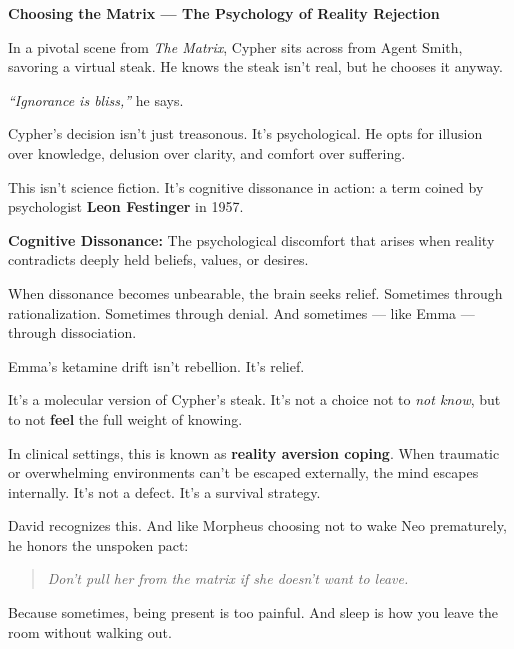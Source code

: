 \begin{PsychologicalSidebar}{\textbf{Choosing the Matrix --- The Psychology of Reality Rejection}}

    In a pivotal scene from \textit{The Matrix}, Cypher sits across from Agent Smith, savoring 
    a virtual steak.  
    He knows the steak isn’t real, but he chooses it anyway.

    \medskip
    
    \textit{“Ignorance is bliss,”} he says.

    \medskip
    
    
    Cypher’s decision isn’t just treasonous. It’s psychological.  
    He opts for illusion over knowledge, delusion over clarity, and comfort over suffering.

    \medskip
    
    
    This isn’t science fiction.  
    It’s cognitive dissonance in action: a term coined by psychologist \textbf{Leon Festinger} in 1957.
    
    \medskip
    
    \textbf{Cognitive Dissonance:}  
    The psychological discomfort that arises when reality contradicts deeply held beliefs, values, 
    or desires.
    
    \medskip
    
    When dissonance becomes unbearable, the brain seeks relief.  
    Sometimes through rationalization.  
    Sometimes through denial.  
    And sometimes --- like Emma --- through dissociation.
    
    \medskip
    
    Emma’s ketamine drift isn’t rebellion.  
    It’s relief.

    \medskip
    
    It's a molecular version of Cypher’s steak.  
    It's not a choice not to \textit{not know}, but to not \textbf{feel} the full weight 
    of knowing.
    
    \medskip
    
    In clinical settings, this is known as \textbf{reality aversion coping}.  
    When traumatic or overwhelming environments can’t be escaped externally, the mind 
    escapes internally.  
    It’s not a defect. It’s a survival strategy.
    
    \medskip
    
    David recognizes this.  
    And like Morpheus choosing not to wake Neo prematurely,  
    he honors the unspoken pact:  
    
    \begin{quote}
    \textit{Don’t pull her from the matrix  
    if she doesn’t want to leave.}
    \end{quote}
    
    Because sometimes, being present is too painful.
    And sleep is how you leave the room without walking out.

\end{PsychologicalSidebar}
